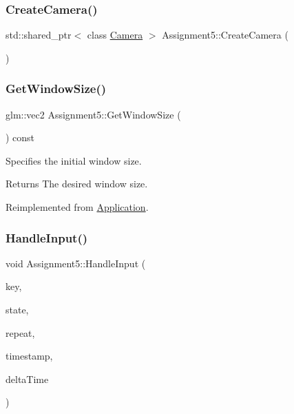 \hypertarget{class_assignment5_af80167ddbf48815460a463fc704eb2ce}{}\label{class_assignment5_af80167ddbf48815460a463fc704eb2ce} 
\subsubsection{\texorpdfstring{Create\+Camera()}{CreateCamera()}}
{\footnotesize\ttfamily std\+::shared\+\_\+ptr$<$ class \hyperlink{class_camera}{Camera} $>$ Assignment5\+::\+Create\+Camera (\begin{DoxyParamCaption}{ }\end{DoxyParamCaption})\hspace{0.3cm}{\ttfamily [static]}}

\hypertarget{class_assignment5_ac199b6149ffa3dbedc7e0d49bb24c628}{}\label{class_assignment5_ac199b6149ffa3dbedc7e0d49bb24c628} 
\subsubsection{\texorpdfstring{Get\+Window\+Size()}{GetWindowSize()}}
{\footnotesize\ttfamily glm\+::vec2 Assignment5\+::\+Get\+Window\+Size (\begin{DoxyParamCaption}{ }\end{DoxyParamCaption}) const\hspace{0.3cm}{\ttfamily [virtual]}}



Specifies the initial window size. 

\begin{DoxyReturn}{Returns}
The desired window size. 
\end{DoxyReturn}


Reimplemented from \hyperlink{class_application_ab190ae0e987fe95682714dd4b2495e82}{Application}.

\hypertarget{class_assignment5_aab8f8440144665db9aafd7ca1cf55cff}{}\label{class_assignment5_aab8f8440144665db9aafd7ca1cf55cff} 
\subsubsection{\texorpdfstring{Handle\+Input()}{HandleInput()}}
{\footnotesize\ttfamily void Assignment5\+::\+Handle\+Input (\begin{DoxyParamCaption}\item[{S\+D\+L\+\_\+\+Keysym}]{key,  }\item[{Uint32}]{state,  }\item[{Uint8}]{repeat,  }\item[{double}]{timestamp,  }\item[{double}]{delta\+Time }\end{DoxyParamCaption})\hspace{0.3cm}{\ttfamily [virtual]}}



